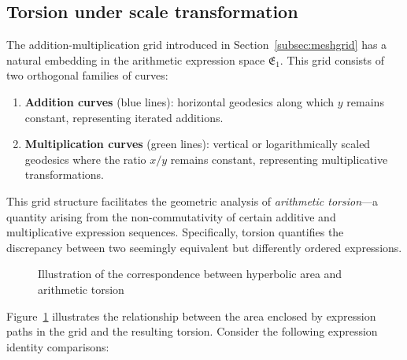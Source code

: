 \subsection{Torsion under scale transformation}\label{subsec:gridsandtorsion}

The addition-multiplication grid introduced in Section~\ref{subsec:meshgrid} has a natural embedding in the arithmetic expression space $\mathfrak{E}_1$. This grid consists of two orthogonal families of curves:

\begin{enumerate}
    \item \textbf{Addition curves} (blue lines): horizontal geodesics along which $y$ remains constant, representing iterated additions.
    \item \textbf{Multiplication curves} (green lines): vertical or logarithmically scaled geodesics where the ratio $x/y$ remains constant, representing multiplicative transformations.
\end{enumerate}

This grid structure facilitates the geometric analysis of \emph{arithmetic torsion}—a quantity arising from the non-commutativity of certain additive and multiplicative expression sequences. Specifically, torsion quantifies the discrepancy between two seemingly equivalent but differently ordered expressions.

\begin{figure}[ht]
    \centering
    \caption{Illustration of the correspondence between hyperbolic area and arithmetic torsion}\label{fig:area-formula}
\end{figure}

Figure~\ref{fig:area-formula} illustrates the relationship between the area enclosed by expression paths in the grid and the resulting torsion. Consider the following expression identity comparisons:

